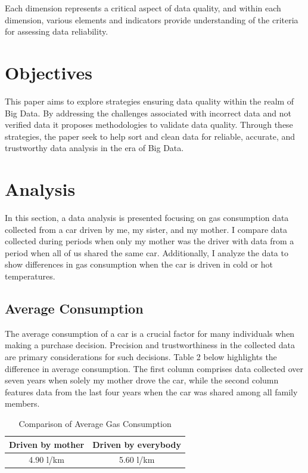 \documentclass[10pt,a4paper]{article}
\begin{document}
Each dimension represents a critical aspect of data quality, and within each dimension, various elements and indicators provide understanding of the criteria for assessing data reliability.\cite{article}

\section{Objectives}
This paper aims to explore strategies ensuring data quality within the realm of Big Data. By addressing the challenges associated with incorrect data and not verified data it proposes methodologies to validate data quality. Through these strategies, the paper seek to help sort and clean data for reliable, accurate, and trustworthy data analysis in the era of Big Data.

\section{Analysis}

In this section,  a data analysis is presented focusing on gas consumption data collected from a car driven by me, my sister, and my mother. I compare data collected during periods when only my mother was the driver with data from a period when all of us shared the same car. Additionally, I analyze the data to show differences in gas consumption when the car is driven in cold or hot temperatures.

\subsection{Average Consumption}

The average consumption of a car is a crucial factor for many individuals when making a purchase decision. Precision and trustworthiness in the collected data are primary considerations for such decisions. Table 2 below highlights the difference in average consumption. The first column comprises data collected over seven years when solely my mother drove the car, while the second column features data from the last four years when the car was shared among all family members.

\begin{table}[h]
  \centering
  \begin{tabular}{|c|c|}
    \hline
    \textbf{Driven by mother} & \textbf{Driven by everybody} \\
    \hline
    4.90 l/km & 5.60 l/km \\
    \hline
  \end{tabular}
  \caption{Comparison of Average Gas Consumption}
\end{table}
\end{document}
